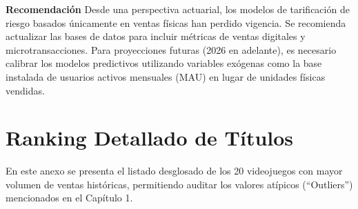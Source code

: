 \documentclass[oneside,11pt]{Latex/Classes/PhDthesisPSnPDF}
\begin{document}
\textbf{Recomendación} Desde una perspectiva actuarial, los modelos de
tarificación de riesgo basados únicamente en ventas físicas han perdido
vigencia. Se recomienda actualizar las bases de datos para incluir
métricas de ventas digitales y microtransacciones. Para proyecciones
futuras (2026 en adelante), es necesario calibrar los modelos
predictivos utilizando variables exógenas como la base instalada de
usuarios activos mensuales (MAU) en lugar de unidades físicas vendidas.

\appendix
\renewcommand{\thechapter}{\Alph{chapter}}

\chapter{Ranking Detallado de Títulos}

En este anexo se presenta el listado desglosado de los 20 videojuegos
con mayor volumen de ventas históricas, permitiendo auditar los valores
atípicos (``Outliers'') mencionados en el Capítulo 1.
\end{document}
